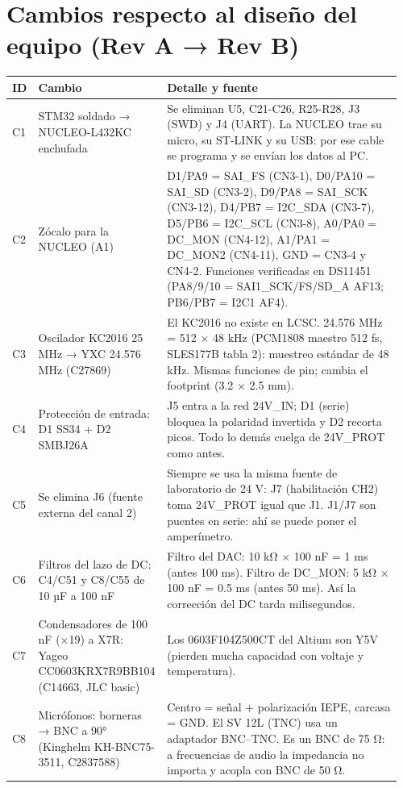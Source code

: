 \documentclass[10pt,a4paper]{article}
\begin{document}
\section{Cambios respecto al diseño del equipo (Rev A → Rev B)}
\begin{longtable}{@{}L{0.06\linewidth}L{0.3\linewidth}L{0.6\linewidth}@{}}\toprule
\textbf{ID} & \textbf{Cambio} & \textbf{Detalle y fuente}\\\midrule\endhead
C1 & STM32 soldado → NUCLEO-L432KC enchufada & Se eliminan U5, C21-C26, R25-R28, J3 (SWD) y J4 (UART). La NUCLEO trae su micro, su ST-LINK y su USB: por ese cable se programa y se envían los datos al PC.\\[2pt]
C2 & Zócalo para la NUCLEO (A1) & D1/PA9 = SAI\_\allowbreak{}FS (CN3-1), D0/PA10 = SAI\_\allowbreak{}SD (CN3-2), D9/PA8 = SAI\_\allowbreak{}SCK (CN3-12), D4/PB7 = I2C\_\allowbreak{}SDA (CN3-7), D5/PB6 = I2C\_\allowbreak{}SCL (CN3-8), A0/PA0 = DC\_\allowbreak{}MON (CN4-12), A1/PA1 = DC\_\allowbreak{}MON2 (CN4-11), GND = CN3-4 y CN4-2. Funciones verificadas en DS11451 (PA8/9/10 = SAI1\_\allowbreak{}SCK/FS/SD\_\allowbreak{}A AF13; PB6/PB7 = I2C1 AF4).\\[2pt]
C3 & Oscilador KC2016 25 MHz → YXC 24.576 MHz (C27869) & El KC2016 no existe en LCSC. 24.576 MHz = 512 × 48 kHz (PCM1808 maestro 512 fs, SLES177B tabla 2): muestreo estándar de 48 kHz. Mismas funciones de pin; cambia el footprint (3.2 × 2.5 mm).\\[2pt]
C4 & Protección de entrada: D1 SS34 + D2 SMBJ26A & J5 entra a la red 24V\_\allowbreak{}IN; D1 (serie) bloquea la polaridad invertida y D2 recorta picos. Todo lo demás cuelga de 24V\_\allowbreak{}PROT como antes.\\[2pt]
C5 & Se elimina J6 (fuente externa del canal 2) & Siempre se usa la misma fuente de laboratorio de 24 V: J7 (habilitación CH2) toma 24V\_\allowbreak{}PROT igual que J1. J1/J7 son puentes en serie: ahí se puede poner el amperímetro.\\[2pt]
C6 & Filtros del lazo de DC: C4/C51 y C8/C55 de 10 µF a 100 nF & Filtro del DAC: 10 kΩ × 100 nF = 1 ms (antes 100 ms). Filtro de DC\_\allowbreak{}MON: 5 kΩ × 100 nF = 0.5 ms (antes 50 ms). Así la corrección del DC tarda milisegundos.\\[2pt]
C7 & Condensadores de 100 nF (×19) a X7R: Yageo CC0603KRX7R9BB104 (C14663, JLC basic) & Los 0603F104Z500CT del Altium son Y5V (pierden mucha capacidad con voltaje y temperatura).\\[2pt]
C8 & Micrófonos: borneras → BNC a 90° (Kinghelm KH-BNC75-3511, C2837588) & Centro = señal + polarización IEPE, carcasa = GND. El SV 12L (TNC) usa un adaptador BNC–TNC. Es un BNC de 75 Ω: a frecuencias de audio la impedancia no importa y acopla con BNC de 50 Ω.\\[2pt]

\end{longtable}
\end{document}
